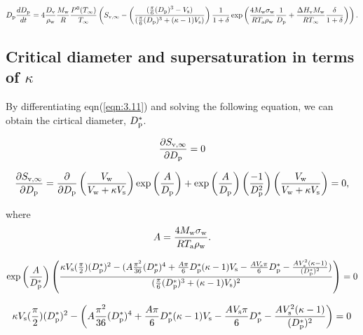 \documentclass[12pt]{article}
\begin{document}
\begin{equation}\label{eqn:3.13}
D_{\rm p}\frac{dD_{\rm p}}{dt}=4 \frac{D_{\rm v}}{\rho_{\rm w}}\frac{M_{\rm w}}{R} \frac{P^{\rm 0}(T_{\infty})}{T_{\infty}}\left(S_{\rm v, \infty} - \left(\frac{(\frac{\pi}{6}(D_{\rm p})^{3}-V_{\rm s}) }{(\frac{\pi}{6}(D_{\rm p})^{3}+(\kappa-1)V_{\rm s})}\right) \frac{1}{1+\delta} \exp \left(\frac{4 M_{\rm w}\sigma_{\rm w}}{R T_{\rm a} \rho_{\rm w}} \frac{1}{D_{\rm p}}+\frac{\Delta H_{\rm v} M_{\rm w}}{R T_{\infty}} \frac{\delta}{1+\delta}\right)\right).
\end{equation}


\subsection{Critical diameter and supersaturation in terms of $\kappa$}

By differentiating eqn(\ref{eqn:3.11}) and solving the following equation, we can obtain the cirtical diameter, $D_{\rm p}^{*}$.

\begin{equation}\label{eqn:3.14}
\frac{\partial S_{\rm v, \infty}}{\partial D_{\rm p}}=0
\end{equation}

\begin{equation}\label{eqn:3.15}
\frac{\partial S_{\rm v, \infty}}{\partial D_{\rm p}}= \frac{\partial}{\partial D_{\rm p}} \left( \frac{V_{\rm w}}{V_{\rm w}+\kappa V_{\rm s}}\right) \exp{\left(\frac{A}{D_{\rm p}}\right)}+\exp{\left(\frac{A}{D_{\rm p}}\right)} \left(\frac{-1}{D_{\rm p}^{2}}\right) \left(\frac{V_{\rm w}}{V_{\rm w}+\kappa V_{\rm s}} \right)=0,
\end{equation}

where 
\begin{equation}\label{eqn:3.16}
A=\frac{4M_{\rm w}\sigma_{\rm w}}{RT_{\rm a}\rho_{\rm w}}.
\end{equation}


\begin{equation}\label{eqn:3.17}
\exp{\left(\frac{A}{D_{\rm p}^{*}}\right)} \left( \frac{\kappa V_{\rm s} (\frac{\pi}{2}) (D_{\rm p}^{*})^2-(A\frac{\pi^{2}}{36}(D_{p}^{*})^4+\frac{A\pi}{6}D_{\rm p}^{*}(\kappa-1)V_{\rm s}-\frac{AV_{\rm s}\pi}{6}D_{\rm p}^{*}-\frac{AV_{s}^2 (\kappa-1)}{(D_{\rm p}^{*})^2})} {(\frac{\pi}{6}(D_{\rm p}^{*})^{3}+(\kappa-1)V_{\rm s})^{2}} \right)=0 
\end{equation}

\begin{equation}\label{eqn:3.18}
 \kappa V_{\rm s} (\frac{\pi}{2}) (D_{\rm p}^{*})^2-\left(A\frac{\pi^{2}}{36}(D_{\rm p}^{*})^4+\frac{A\pi}{6}D_{\rm p}^{*}(\kappa-1)V_{\rm s}-\frac{AV_{\rm s}\pi}{6}D_{\rm p}^{*}-\frac{AV_{\rm s}^2 (\kappa-1)}{(D_{\rm p}^{*})^2}\right)=0
\end{equation}
\end{document}
